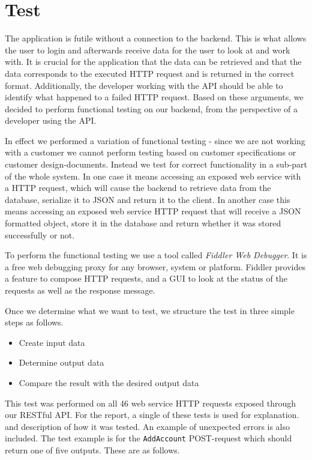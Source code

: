 \chapter{Test}
\label{chap:test}

The application is futile without a connection to the backend. This is what allows the user to login and afterwards receive data for the user to look at and work with. It is crucial for the application that the data can be retrieved and that the data corresponds to the executed HTTP request and is returned in the correct format. Additionally, the developer working with the API should be able to identify what happened to a failed HTTP request. Based on these arguments, we decided to perform functional testing on our backend, from the perspective of a developer using the API. 

In effect we performed a variation of functional testing - since we are not working with a customer we cannot perform testing based on customer specifications or customer design-documents. Instead we test for correct functionality in a sub-part of the whole system. In one case it means accessing an exposed web service with a HTTP request, which will cause the backend to retrieve data from the database, serialize it to JSON and return it to the client. In another case this means accessing an exposed web service HTTP request that will receive a JSON formatted object, store it in the database and return whether it was stored successfully or not.

To perform the functional testing we use a tool called \textit{Fiddler Web Debugger}. It is a free web debugging proxy for any browser, system or platform\cite{fiddler}. Fiddler provides a feature to compose HTTP requests, and a GUI to look at the status of the requests as well as the response message. 

Once we determine what we want to test, we structure the test in three simple steps as follows.
\begin{itemize}
\item Create input data
\item Determine output data
\item Compare the result with the desired output data
\end{itemize}

This test was performed on all 46 web service HTTP requests exposed through our RESTful API. For the report, a single of these tests is used for explanation. and description of how it was tested. An example of unexpected errors is also included. The test example is for the \texttt{AddAccount} POST-request which should return one of five outputs. These are as follows.

